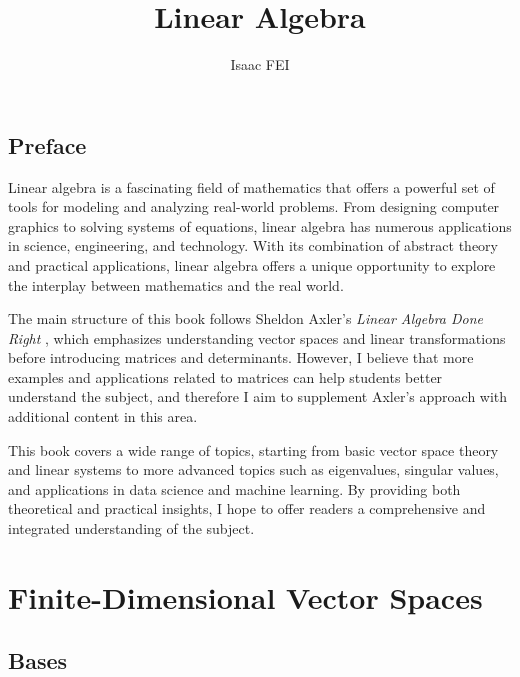 \documentclass[thmcnt=section, color=blue, 12pt]{my-elegantbook}
\title{Linear Algebra}
\author{Isaac FEI}
\begin{document}
\maketitle


\frontmatter

\section*{Preface}

Linear algebra is a fascinating field of mathematics 
that offers a powerful set of tools for modeling 
and analyzing real-world problems. From designing computer graphics 
to solving systems of equations, linear algebra 
has numerous applications in science, engineering, and technology. 
With its combination of abstract theory and practical applications, 
linear algebra offers a unique opportunity to explore the interplay 
between mathematics and the real world.

The main structure of this book follows 
Sheldon Axler's \textit{Linear Algebra Done Right} \cite{axlerLinearAlgebraDone1997}, 
which emphasizes understanding vector spaces and linear transformations 
before introducing matrices and determinants. 
However, I believe that more examples and applications 
related to matrices can help students better understand the subject, 
and therefore I aim to supplement 
Axler's approach with additional content in this area.

This book covers a wide range of topics, 
starting from basic vector space theory and linear systems 
to more advanced topics such as eigenvalues, 
singular values, and applications in data science and machine learning. 
By providing both theoretical and practical insights, 
I hope to offer readers a comprehensive 
and integrated understanding of the subject.


\tableofcontents
\mainmatter




\chapter{Finite-Dimensional Vector Spaces}


\section{Bases}
\end{document}
